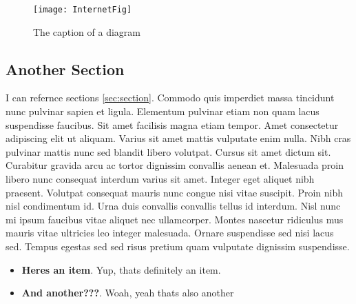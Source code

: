 \begin{figure}[ht]
\centering
\texttt{[image: InternetFig]}
\caption {The caption of a diagram}
\label{fig:internet}
\vspace{6mm}
\end{figure}

\subsection{Another Section}
\label{ssec:nother}

I can refernce sections \ref{sec:section}. Commodo quis imperdiet massa tincidunt nunc pulvinar sapien et ligula. Elementum pulvinar etiam non quam lacus suspendisse faucibus. Sit amet facilisis magna etiam tempor. Amet consectetur adipiscing elit ut aliquam. Varius sit amet mattis vulputate enim nulla. Nibh cras pulvinar mattis nunc sed blandit libero volutpat. Cursus sit amet dictum sit. Curabitur gravida arcu ac tortor dignissim convallis aenean et. Malesuada proin libero nunc consequat interdum varius sit amet. Integer eget aliquet nibh praesent. Volutpat consequat mauris nunc congue nisi vitae suscipit. Proin nibh nisl condimentum id. Urna duis convallis convallis tellus id interdum. Nisl nunc mi ipsum faucibus vitae aliquet nec ullamcorper. Montes nascetur ridiculus mus mauris vitae ultricies leo integer malesuada. Ornare suspendisse sed nisi lacus sed. Tempus egestas sed sed risus pretium quam vulputate dignissim suspendisse.

 \begin{itemize}

 \item \textbf{Heres an item}. Yup, thats definitely an item.
 \\

 \item \textbf{And another???}. Woah, yeah thats also another
 \\

\end{itemize}
